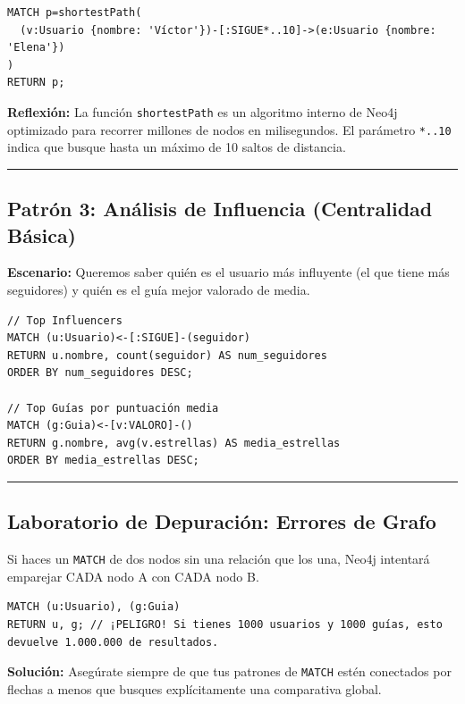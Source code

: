 \documentclass[12pt,a4paper]{article}
\begin{document}
\begin{tcolorbox}[title=Algoritmo de Camino Más Corto]
\begin{lstlisting}
MATCH p=shortestPath(
  (v:Usuario {nombre: 'Víctor'})-[:SIGUE*..10]->(e:Usuario {nombre: 'Elena'})
)
RETURN p;
\end{lstlisting}
\end{tcolorbox}

\textbf{Reflexión:} La función \texttt{shortestPath} es un algoritmo interno de Neo4j optimizado para recorrer millones de nodos en milisegundos. El parámetro \texttt{*..10} indica que busque hasta un máximo de 10 saltos de distancia.

\begin{center}\rule{0.5\linewidth}{0.5pt}\end{center}

\subsection{Patrón 3: Análisis de Influencia (Centralidad Básica)}\label{influence}
\textbf{Escenario:} Queremos saber quién es el usuario más influyente (el que tiene más seguidores) y quién es el guía mejor valorado de media.

\begin{tcolorbox}[title=Agregación en Grafos]
\begin{lstlisting}
// Top Influencers
MATCH (u:Usuario)<-[:SIGUE]-(seguidor)
RETURN u.nombre, count(seguidor) AS num_seguidores
ORDER BY num_seguidores DESC;

// Top Guías por puntuación media
MATCH (g:Guia)<-[v:VALORO]-()
RETURN g.nombre, avg(v.estrellas) AS media_estrellas
ORDER BY media_estrellas DESC;
\end{lstlisting}
\end{tcolorbox}

\begin{center}\rule{0.5\linewidth}{0.5pt}\end{center}

\subsection{Laboratorio de Depuración: Errores de Grafo}\label{debug}

\begin{tcolorbox}[title=Peligro: El Producto Cartesiano, colframe=red!75!black]
Si haces un \texttt{MATCH} de dos nodos sin una relación que los una, Neo4j intentará emparejar CADA nodo A con CADA nodo B.
\begin{lstlisting}
MATCH (u:Usuario), (g:Guia) 
RETURN u, g; // ¡PELIGRO! Si tienes 1000 usuarios y 1000 guías, esto devuelve 1.000.000 de resultados.
\end{lstlisting}
\end{tcolorbox}

\textbf{Solución:} Asegúrate siempre de que tus patrones de \texttt{MATCH} estén conectados por flechas a menos que busques explícitamente una comparativa global.
\end{document}
